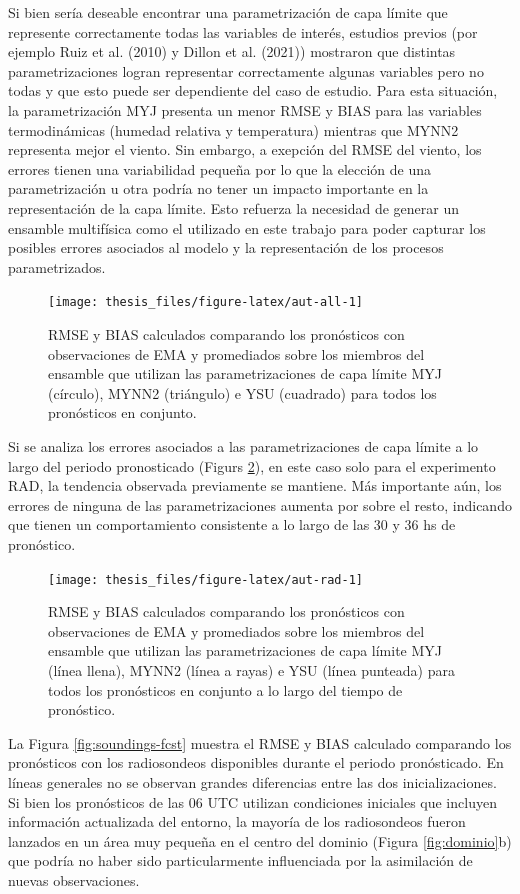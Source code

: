 \documentclass[12pt,oneside]{reedthesis}
\begin{document}
Si bien sería deseable encontrar una parametrización de capa límite que represente correctamente todas las variables de interés, estudios previos (por ejemplo Ruiz et al. (2010) y Dillon et al. (2021)) mostraron que distintas parametrizaciones logran representar correctamente algunas variables pero no todas y que esto puede ser dependiente del caso de estudio. Para esta situación, la parametrización MYJ presenta un menor RMSE y BIAS para las variables termodinámicas (humedad relativa y temperatura) mientras que MYNN2 representa mejor el viento. Sin embargo, a exepción del RMSE del viento, los errores tienen una variabilidad pequeña por lo que la elección de una parametrización u otra podría no tener un impacto importante en la representación de la capa límite. Esto refuerza la necesidad de generar un ensamble multifísica como el utilizado en este trabajo para poder capturar los posibles errores asociados al modelo y la representación de los procesos parametrizados.


\begin{figure}

{\centering \texttt{[image: thesis\_files/figure-latex/aut-all-1]} 

}

\caption{RMSE y BIAS calculados comparando los pronósticos con observaciones de EMA y promediados sobre los miembros del ensamble que utilizan las parametrizaciones de capa límite MYJ (círculo), MYNN2 (triángulo) e YSU (cuadrado) para todos los pronósticos en conjunto.}\label{fig:aut-all}
\end{figure}
Si se analiza los errores asociados a las parametrizaciones de capa límite a lo largo del periodo pronosticado (Figurs \ref{fig:aut-rad}), en este caso solo para el experimento RAD, la tendencia observada previamente se mantiene. Más importante aún, los errores de ninguna de las parametrizaciones aumenta por sobre el resto, indicando que tienen un comportamiento consistente a lo largo de las 30 y 36 hs de pronóstico.


\begin{figure}

{\centering \texttt{[image: thesis\_files/figure-latex/aut-rad-1]} 

}

\caption{RMSE y BIAS calculados comparando los pronósticos con observaciones de EMA y promediados sobre los miembros del ensamble que utilizan las parametrizaciones de capa límite MYJ (línea llena), MYNN2 (línea a rayas) e YSU (línea punteada) para todos los pronósticos en conjunto a lo largo del tiempo de pronóstico.}\label{fig:aut-rad}
\end{figure}
La Figura \ref{fig:soundings-fcst} muestra el RMSE y BIAS calculado comparando los pronósticos con los radiosondeos disponibles durante el periodo pronósticado. En líneas generales no se observan grandes diferencias entre las dos inicializaciones. Si bien los pronósticos de las 06 UTC utilizan condiciones iniciales que incluyen información actualizada del entorno, la mayoría de los radiosondeos fueron lanzados en un área muy pequeña en el centro del dominio (Figura \ref{fig:dominio}b) que podría no haber sido particularmente influenciada por la asimilación de nuevas observaciones.
\end{document}
